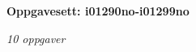 \centerline{\bf Oppgavesett: i01290no-i01299no}
\vskip 10pt
\centerline{\it 10 oppgaver}\vskip 10pt
\vskip 10pt
